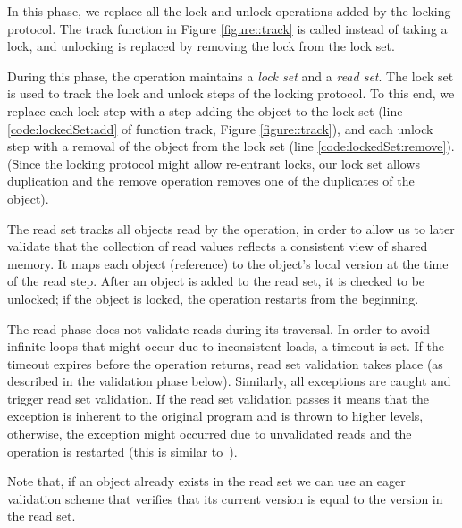 In this phase, we replace all the lock and unlock operations added by the locking protocol.
The track function in Figure \ref{figure::track} is called instead of taking a lock, and unlocking 
is replaced by removing the lock from the lock set.

During this phase, the operation maintains a \emph{lock set} and a \emph{read set}. 
The lock set is used to track the lock and unlock steps of the locking protocol. To this end, we replace each lock step 
  with a step adding the object to the lock set 
  (line \ref{code:lockedSet:add} of function track, Figure \ref{figure::track}), 
  and each unlock step with a removal of the object 
  from the lock set (line \ref{code:lockedSet:remove}). 
  (Since the locking protocol might allow re-entrant locks, 
  our lock set allows duplication and the remove 
  operation removes one of the duplicates of the object).
  
The read set  tracks all objects read by the 
operation, in order to allow us to later validate that the collection of read
values reflects a consistent view of shared memory.  It maps each object (reference)  
to the object's local version at the time of the read step. After an object is
added to the read set, it is checked to be unlocked; if the object is locked, the operation restarts from the beginning.



 
The read phase does not validate reads during its traversal.  
In order to avoid infinite loops that might occur due to inconsistent loads, a timeout is set. 
If the timeout expires before the operation returns, read set 
validation takes place (as described in the validation phase below).
Similarly, all exceptions are caught and trigger read set validation. 
If the read set validation passes it means that the exception is inherent
to the original program and is thrown to higher levels, otherwise, the
exception might occurred due to unvalidated reads and the operation is
restarted (this is similar to~\cite{Nakaike:2010}). 

Note that, if an object already exists in the read set we can use an eager
validation scheme that verifies that its current version is equal to the
version in the read set. 
  
